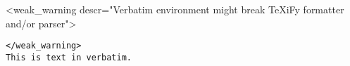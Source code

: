 \documentclass{article}
\begin{document}
    <weak_warning descr="Verbatim environment might break TeXiFy formatter and/or parser">\begin{verbatim}</weak_warning>
This is text in verbatim.
    \end{verbatim}
\end{document}
